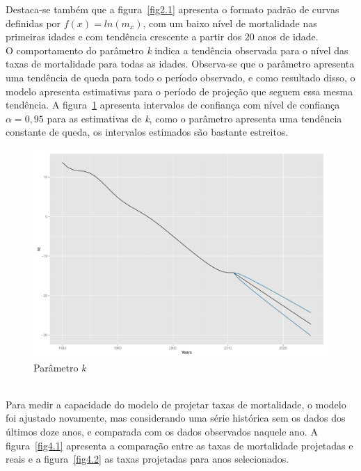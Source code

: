 \documentclass[12pt, 						%
			openright, 					%
			twoside,					%
			a4paper,x					%
			english,					%
			brazil]{abntex2}				%
\begin{document}
	Destaca-se também que a figura~\ref{fig2.1} apresenta o formato padrão de curvas definidas por $f(x) = ln(m_{x})$, com um baixo nível de mortalidade nas primeiras idades e com tendência crescente a partir dos 20 anos de idade. \\
	O comportamento do parâmetro \textit{k} indica a tendência observada para o nível das taxas de mortalidade para todas as idades. Observa-se que o parâmetro apresenta uma tendência de queda para todo o período observado, e como resultado disso, o modelo apresenta estimativas para o período de projeção que seguem essa mesma tendência. A figura~\ref{fig3} apresenta intervalos de confiança com nível de confiança $\alpha= 0,95$ para as estimativas de \textit{k}, como o parâmetro apresenta uma tendência constante de queda, os intervalos estimados são bastante estreitos. \\
	\begin{figure}[!htb]
	\caption{\label{fig3} Parâmetro \textit{k}}
		\begin{center}
			\includegraphics[scale = 0.35]{Graphs/DR_LC_kt_f.pdf}
		\end{center}
	\end{figure} \\
	Para medir a capacidade do modelo de projetar taxas de mortalidade, o modelo foi ajustado novamente, mas considerando uma série histórica sem os dados dos últimos doze anos, e comparada com os dados observados naquele ano. A figura~\ref{fig4.1} apresenta a comparação entre as taxas de mortalidade projetadas e reais e a figura~\ref{fig4.2} as taxas projetadas para anos selecionados. \\
\end{document}
